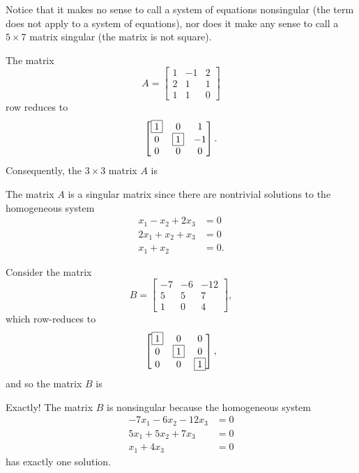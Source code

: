 \documentclass{ximera}
\begin{document}
Notice that it makes no sense to call a system of equations
nonsingular (the term does not apply to a system of equations), nor
does it make any sense to call a $5\times 7$ matrix singular (the
matrix is not square).

\begin{example}
The matrix
\[
  A = \begin{bmatrix}
    1 & -1 & 2 \\
    2 & 1 & 1 \\
    1 & 1 & 0  
  \end{bmatrix}
\]
row reduces to
\[
  \begin{bmatrix}
    \fbox{1} & 0 & 1 \\
    0 & \fbox{1} & -1 \\
    0 & 0 & 0 
  \end{bmatrix}.
\]
Consequently, the $3\times 3$ matrix $A$ is
\begin{multipleChoice}
\end{multipleChoice}

\begin{feedback}[correct]
  The matrix $A$ is a singular matrix since there are nontrivial
  solutions to the homogeneous system
  \begin{align*}
    x_1 -x_2 +2x_3 & = 0\\
    2x_1+ x_2 + x_3 & =0 \\
    x_1 + x_2 & =0.
  \end{align*}
\end{feedback}
\end{example}

\begin{example}
  Consider the matrix
  \[
    B = \begin{bmatrix}
      -7&-6&- 12\\
      5&5&7 \\
      1&0&4
    \end{bmatrix},
  \]
  which row-reduces to
  \[
    \begin{bmatrix}
      \fbox{1}&0&0 \\
      0&\fbox{1}&0 \\
      0&0&\fbox{1}
    \end{bmatrix},
  \]
  and so the matrix $B$ is 
  \begin{multipleChoice}
  \end{multipleChoice}
  \begin{feedback}[correct]
    Exactly!  The matrix $B$ is nonsingular because the homogeneous system
    \begin{align*}
      -7x_1 -6 x_2 - 12x_3 &=0\\
      5x_1  + 5x_2 + 7x_3 &=0\\
      x_1 +4x_3 &=0
    \end{align*}
    has exactly one solution.
  \end{feedback}
\end{example}
\end{document}
